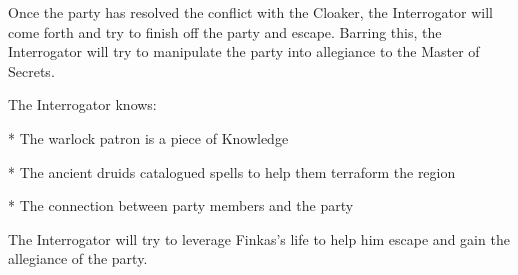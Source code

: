 Once the party has resolved the conflict with the Cloaker, the Interrogator will come forth and try to finish off the party and escape.
Barring this, the Interrogator will try to manipulate the party into allegiance to the Master of Secrets.

The Interrogator knows:

* The warlock patron is a piece of Knowledge

* The ancient druids catalogued spells to help them terraform the region

* The connection between party members and the party

The Interrogator will try to leverage Finkas's life to help him escape and gain the allegiance of the party.
